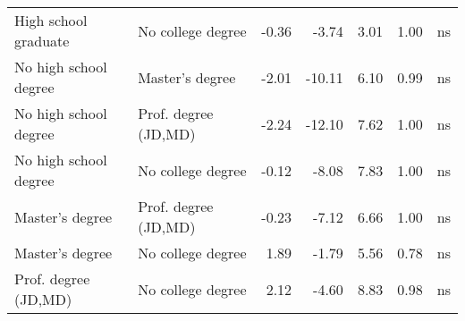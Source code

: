 \documentclass{article}
\begin{document}
\begin{table}[ht]
\begin{tabular}{llrrrrl}
 High school graduate & No college degree  & -0.36 & -3.74 & 3.01 & 1.00 & ns \\ 
 No high school degree & Master's degree  & -2.01 & -10.11 & 6.10 & 0.99 & ns \\ 
 No high school degree & Prof. degree (JD,MD)  & -2.24 & -12.10 & 7.62 & 1.00 & ns \\ 
 No high school degree & No college degree  & -0.12 & -8.08 & 7.83 & 1.00 & ns \\ 
 Master's degree & Prof. degree (JD,MD)  & -0.23 & -7.12 & 6.66 & 1.00 & ns \\ 
 Master's degree & No college degree  & 1.89 & -1.79 & 5.56 & 0.78 & ns \\ 
 Prof. degree (JD,MD) & No college degree  & 2.12 & -4.60 & 8.83 & 0.98 & ns \\ 
   \hline
\end{tabular}
\end{table}
\end{document}
